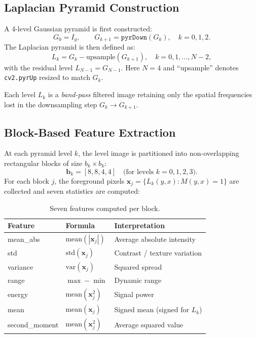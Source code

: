 \documentclass[11pt,a4paper]{article}
\begin{document}
\subsection{Laplacian Pyramid Construction}

A 4-level Gaussian pyramid is first constructed:
\[
  G_0 = I_g, \qquad G_{k+1} = \texttt{pyrDown}(G_k), \quad k = 0,1,2.
\]
The Laplacian pyramid is then defined as:
\begin{equation}
  L_k = G_k - \text{upsample}(G_{k+1}), \quad k = 0, 1, \ldots, N-2,
  \label{eq:laplacian}
\end{equation}
with the residual level $L_{N-1} = G_{N-1}$.  Here $N = 4$ and
``upsample'' denotes \texttt{cv2.pyrUp} resized to match $G_k$.

Each level $L_k$ is a \emph{band-pass} filtered image retaining only the
spatial frequencies lost in the downsampling step $G_k \to G_{k+1}$.

\subsection{Block-Based Feature Extraction}

At each pyramid level $k$, the level image is partitioned into
non-overlapping rectangular blocks of size $b_k \times b_k$:
\[
  \mathbf{b}_k = [8, 8, 4, 4]
  \quad \text{(for levels } k = 0,1,2,3\text{)}.
\]
For each block $j$, the foreground pixels $\mathbf{x}_j = \{L_k(y,x) : M(y,x)=1\}$
are collected and seven statistics are computed:

\begin{table}[H]
  \centering
  \caption{Seven features computed per block.}
  \label{tab:features}
  \begin{tabular}{@{}lll@{}}
    \toprule
    \textbf{Feature} & \textbf{Formula} & \textbf{Interpretation} \\
    \midrule
    mean\_abs      & $\text{mean}(|\mathbf{x}_j|)$   & Average absolute intensity \\
    std            & $\text{std}(\mathbf{x}_j)$       & Contrast / texture variation \\
    variance       & $\text{var}(\mathbf{x}_j)$       & Squared spread \\
    range          & $\max - \min$                    & Dynamic range \\
    energy         & $\text{mean}(\mathbf{x}_j^2)$   & Signal power \\
    mean           & $\text{mean}(\mathbf{x}_j)$      & Signed mean (signed for $L_k$) \\
    second\_moment & $\text{mean}(\mathbf{x}_j^2)$   & Average squared value \\
    \bottomrule
  \end{tabular}
\end{table}
\end{document}
